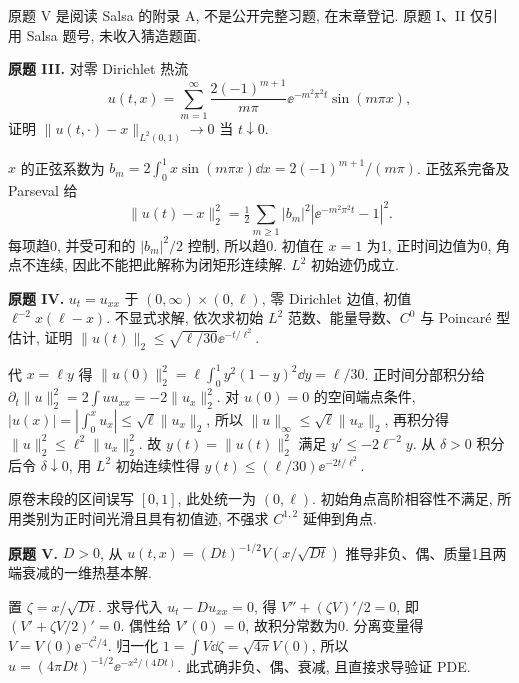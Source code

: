 原题 V 是阅读 Salsa 的附录 A, 不是公开完整习题, 在末章登记.
原题 I、II 仅引用 Salsa 题号, 未收入猜造题面.
\begin{exercise}\label{ps:2III}
\textbf{原题 III.} 对零 Dirichlet 热流
\[
u(t,x)=\sum_{m=1}^\infty\frac{2(-1)^{m+1}}{m\pi}\ee^{-m^2\pi^2t}\sin(m\pi x),
\]
证明 $\|u(t,\cdot)-x\|_{L^2(0,1)}\to0$ 当 $t\downarrow0$.
\end{exercise}
\begin{solution}
$x$ 的正弦系数为 $b_m=2\int_0^1x\sin(m\pi x)\dd x=2(-1)^{m+1}/(m\pi)$. 正弦系完备及 Parseval 给
\[
\|u(t)-x\|_2^2=\tfrac12\sum_{m\ge1}|b_m|^2|\ee^{-m^2\pi^2t}-1|^2.
\]
每项趋0, 并受可和的 $|b_m|^2/2$ 控制, 所以趋0. 初值在 $x=1$ 为1, 正时间边值为0, 角点不连续, 因此不能把此解称为闭矩形连续解. $L^2$ 初始迹仍成立.
\end{solution}
\begin{exercise}\label{ps:2IV}
\textbf{原题 IV.} $u_t=u_{xx}$ 于 $(0,\infty)\times(0,\ell)$, 零 Dirichlet 边值, 初值 $\ell^{-2}x(\ell-x)$. 不显式求解, 依次求初始 $L^2$ 范数、能量导数、$C^0$ 与 Poincaré 型估计, 证明 $\|u(t)\|_2\le\sqrt{\ell/30}\ee^{-t/\ell^2}$.
\end{exercise}
\begin{solution}
代 $x=\ell y$ 得 $\|u(0)\|_2^2=\ell\int_0^1y^2(1-y)^2\dd y=\ell/30$. 正时间分部积分给 $\partial_t\|u\|_2^2=2\int u u_{xx}=-2\|u_x\|_2^2$. 对 $u(0)=0$ 的空间端点条件,
$|u(x)|=|\int_0^xu_x|\le\sqrt\ell\|u_x\|_2$, 所以 $\|u\|_\infty\le\sqrt\ell\|u_x\|_2$, 再积分得 $\|u\|_2^2\le\ell^2\|u_x\|_2^2$. 故 $y(t)=\|u(t)\|_2^2$ 满足 $y'\le-2\ell^{-2}y$. 从 $\delta>0$ 积分后令 $\delta\downarrow0$, 用 $L^2$ 初始连续性得 $y(t)\le(\ell/30)\ee^{-2t/\ell^2}$.

原卷末段的区间误写 $[0,1]$, 此处统一为 $(0,\ell)$. 初始角点高阶相容性不满足, 所用类别为正时间光滑且具有初值迹, 不强求 $C^{1,2}$ 延伸到角点.
\end{solution}
\begin{exercise}\label{ps:2V}
\textbf{原题 V.} $D>0$, 从 $u(t,x)=(Dt)^{-1/2}V(x/\sqrt{Dt})$ 推导非负、偶、质量1且两端衰减的一维热基本解.
\end{exercise}
\begin{solution}
置 $\zeta=x/\sqrt{Dt}$. 求导代入 $u_t-Du_{xx}=0$, 得 $V''+(\zeta V)'/2=0$, 即 $(V'+\zeta V/2)'=0$. 偶性给 $V'(0)=0$, 故积分常数为0. 分离变量得 $V=V(0)\ee^{-\zeta^2/4}$. 归一化 $1=\int V\dd\zeta=\sqrt{4\pi}V(0)$, 所以 $u=(4\pi Dt)^{-1/2}\ee^{-x^2/(4Dt)}$. 此式确非负、偶、衰减, 且直接求导验证 PDE.
\end{solution}
